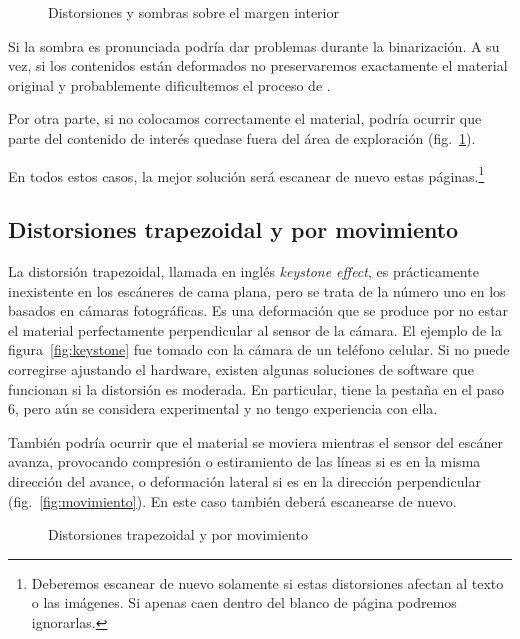 \documentclass[%
	a5paper,
	10pt,
	twoside,
	openright,
	final,
]{memoir}
\begin{document}
{	\begin{figure}
		\hfill
		\caption{Distorsiones y sombras sobre el margen interior\label{fig:distortion1}}
	\end{figure}

	Si la sombra es pronunciada podría dar problemas durante la binarización. A su vez, si los contenidos están deformados no preservaremos exactamente el material original y probablemente dificultemos el proceso de \ocr.

	Por otra parte, si no colocamos correctamente el material, podría ocurrir que parte del contenido de interés quedase fuera del área de exploración (fig.~\ref{fig:distortion1}).

	En todos estos casos, la mejor solución será escanear de nuevo estas páginas.\footnote{Deberemos escanear de nuevo solamente si estas distorsiones afectan al texto o las imágenes. Si apenas caen dentro del blanco de página podremos ignorarlas.}

	\subsection{Distorsiones trapezoidal y por movimiento} La distorsión trapezoidal, llamada en inglés \emph{keystone effect}, es prácticamente inexistente en los escáneres de cama plana, pero se trata de la número uno en los basados en cámaras fotográficas. Es una deformación que se produce por no estar el material perfectamente perpendicular al sensor de la cámara. El ejemplo de la figura~\ref{fig:keystone} fue tomado con la cámara de un teléfono celular. Si no puede corregirse ajustando el hardware, existen algunas soluciones de software que funcionan si la distorsión es moderada. En particular, \scantailor tiene la pestaña  en el paso 6, pero aún se considera experimental y no tengo experiencia con ella.

	También podría ocurrir que el material se moviera mientras el sensor del escáner avanza, provocando compresión o estiramiento de las líneas si es en la misma dirección del avance, o deformación lateral si es en la dirección perpendicular (fig.~\ref{fig:movimiento}). En este caso también deberá escanearse de nuevo.

	\begin{figure}
		\hfill
		\caption{Distorsiones trapezoidal y por movimiento\label{fig:distortion2}}
	\end{figure}

}
\end{document}

